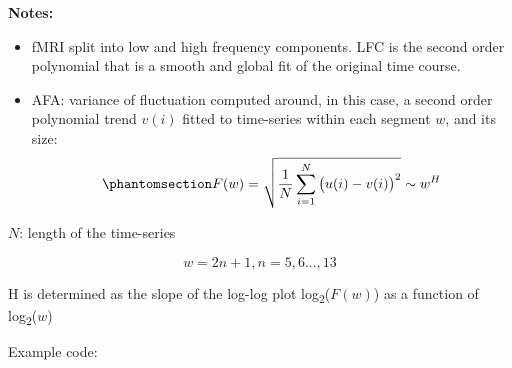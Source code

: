 \documentclass[
  sn-vancouver,
  Numbered,
  referee,
  lineno]{sn-jnl}
\providecommand{\tightlist}{%
  \setlength{\itemsep}{0pt}\setlength{\parskip}{0pt}}\usepackage{longtable,booktabs,array}
\begin{document}
\textbf{Notes:}

\begin{itemize}
\tightlist
\item
  fMRI split into low and high frequency components. LFC is the second
  order polynomial that is a smooth and global fit of the original time
  course.
\item
  AFA: variance of fluctuation computed around, in this case, a second
  order polynomial trend \(v(i)\) fitted to time-series within each
  segment \(w\), and its size:
  \begin{equation}\phantomsection\label{eq-AFA}{
  F(w) = \sqrt{\frac{1}{N} \sum_{i=1}^{N} \big(u(i) - v(i)\big)^2} \sim w^H
  }\end{equation}
\end{itemize}

\(N\): length of the time-series

\[
w = 2n + 1, n = 5,6..., 13
\]

H is determined as the slope of the log-log plot
log\textsubscript{2}(\(F(w)\)) as a function of
log\textsubscript{2}(\(w\))

Example code:
\end{document}
